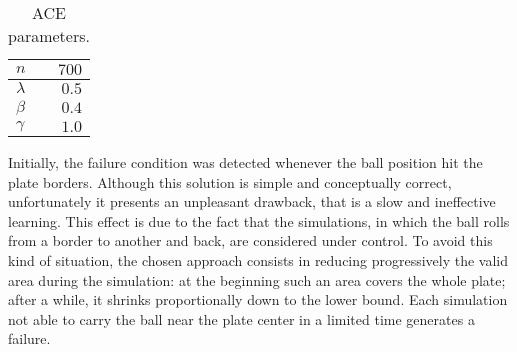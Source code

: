 \begin{table}
  \begin{center}
    \begin{tabular}{| l || r | }
      \hline
         $n$            & $700$ \\ \hline
         $\lambda$      & $0.5$ \\ \hline
         $\beta$        & $0.4$ \\ \hline
         $\gamma$       & $1.0$ \\ \hline
    \end{tabular}
    \caption{ACE parameters.}
    \label{tab:aceparams}
  \end{center}
\end{table}

Initially, the failure condition was detected whenever the ball position hit
the plate borders.
Although this solution is simple and conceptually correct, unfortunately
it presents an unpleasant drawback, that is a slow and ineffective learning.
This effect is due to the fact that the simulations, in which the ball rolls 
from a border to another and back, are considered under control.
To avoid this kind of situation, the chosen approach consists in reducing
progressively the valid area during the simulation: at the beginning
such an area covers the whole plate; after a while, it shrinks proportionally
down to the lower bound. Each simulation not able to carry
the ball near the plate center in a limited time generates a failure.

